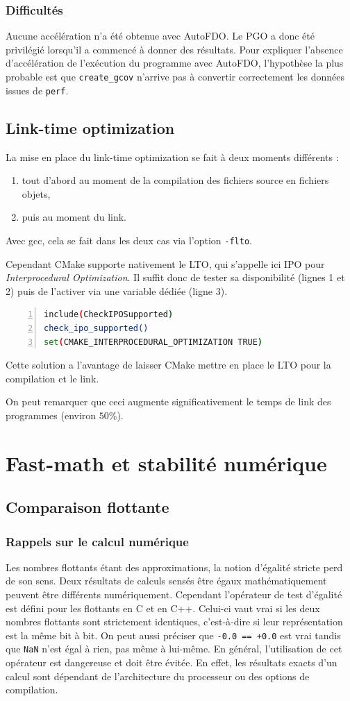 \documentclass[a4paper,11pt]{report}
\begin{document}
\subsubsection{Difficultés}
Aucune accélération n'a été obtenue avec AutoFDO.
Le PGO a donc été privilégié lorsqu'il a commencé à donner des résultats.
Pour expliquer l'absence d'accélération de l'exécution du programme avec AutoFDO, l'hypothèse la plus probable est que \verb'create_gcov' n'arrive pas à convertir correctement les données issues de \verb'perf'.

\subsection{Link-time optimization}
La mise en place du link-time optimization se fait à deux moments différents :
\begin{enumerate}
    \item tout d'abord au moment de la compilation des fichiers source en fichiers objets,
    \item puis au moment du link.
\end{enumerate}
Avec gcc, cela se fait dans les deux cas via l'option \verb'-flto'.

Cependant CMake supporte nativement le LTO, qui s'appelle ici IPO pour \emph{Interprocedural Optimization}.
Il suffit donc de tester sa disponibilité (lignes 1 et 2) puis de l'activer via une variable dédiée (ligne 3).
\begin{lstlisting}[language=bash,numbers=left]
include(CheckIPOSupported)
check_ipo_supported()
set(CMAKE_INTERPROCEDURAL_OPTIMIZATION TRUE)
\end{lstlisting}
Cette solution a l'avantage de laisser CMake mettre en place le LTO pour la compilation et le link.

On peut remarquer que ceci augmente significativement le temps de link des programmes (environ $50\%$).

\section{Fast-math et stabilité numérique}
\subsection{Comparaison flottante}
\subsubsection{Rappels sur le calcul numérique}
Les nombres flottants étant des approximations, la notion d'égalité stricte perd de son sens.
Deux résultats de calculs sensés être égaux mathématiquement peuvent être différents numériquement.
Cependant l'opérateur de test d'égalité est défini pour les flottants en C et en C++.
Celui-ci vaut vrai si les deux nombres flottants sont strictement identiques, c'est-à-dire si leur représentation est la même bit à bit.
On peut aussi préciser que \verb'-0.0 == +0.0' est vrai tandis que \verb'NaN' n'est égal à rien, pas même à lui-même.
En général, l'utilisation de cet opérateur est dangereuse et doit être évitée.
En effet, les résultats exacts d'un calcul sont dépendant de l'architecture du processeur ou des options de compilation.
\end{document}
